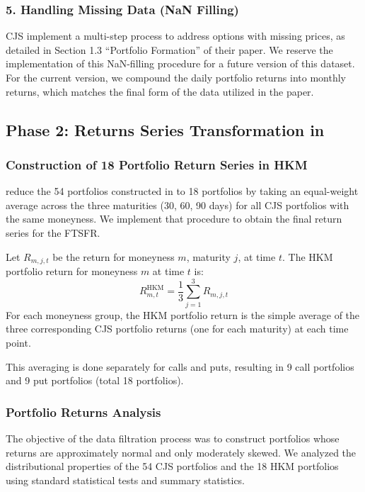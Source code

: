\documentclass[11pt]{article}
\begin{document}
\subsubsection{5. Handling Missing Data (NaN Filling)}

CJS implement a multi-step process to address options with missing prices, as detailed in Section 1.3 ``Portfolio Formation'' of their paper. We reserve the implementation of this NaN-filling procedure for a future version of this dataset. For the current version, we compound the daily portfolio returns into monthly returns, which matches the final form of the data utilized in the paper.


\subsection{Phase 2: Returns Series Transformation in \citet{He2017}}
\subsubsection{Construction of 18 Portfolio Return Series in HKM}

\citet{He2017} reduce the 54 portfolios constructed in \citet{Constantinides2013} to 18 portfolios by taking an equal-weight average across the three maturities (30, 60, 90 days) for all CJS portfolios with the same moneyness. We implement that procedure to obtain the final return series for the FTSFR.

Let \( R_{m,j,t} \) be the return for moneyness \( m \), maturity \( j \), at time \( t \).
The HKM portfolio return for moneyness \( m \) at time \( t \) is:
\[
R_{m,t}^{\mathrm{HKM}} = \frac{1}{3} \sum_{j=1}^{3} R_{m,j,t}
\]
For each moneyness group, the HKM portfolio return is the simple average of the three corresponding CJS portfolio returns (one for each maturity) at each time point.

This averaging is done separately for calls and puts, resulting in 9 call portfolios and 9 put portfolios (total 18 portfolios).



\subsubsection{Portfolio Returns Analysis}

The objective of the data filtration process was to construct portfolios whose returns are approximately normal and only moderately skewed. We analyzed the distributional properties of the 54 CJS portfolios and the 18 HKM portfolios using standard statistical tests and summary statistics.
\end{document}
